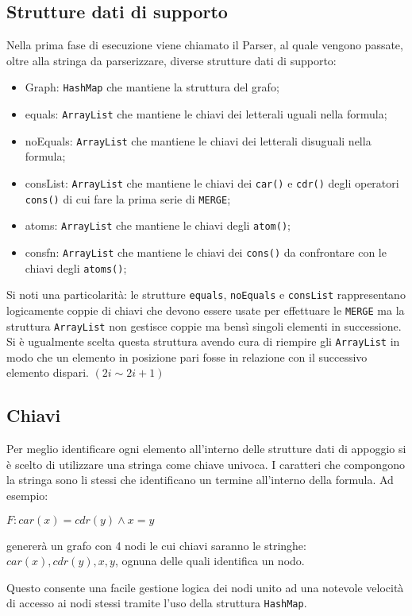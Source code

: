 \documentclass[a4paper,11pt]{article}
\begin{document}
\subsection{Strutture dati di supporto}
Nella prima fase di esecuzione viene chiamato il Parser, al quale vengono passate, oltre alla stringa da parserizzare, diverse strutture dati di supporto:
\begin{itemize}
	\item Graph: {\tt HashMap} che mantiene la struttura del grafo;
	\item equals: {\tt ArrayList} che mantiene le chiavi dei letterali uguali nella formula;
	\item noEquals: {\tt ArrayList} che mantiene le chiavi dei letterali disuguali nella formula;
	\item consList: {\tt ArrayList} che mantiene le chiavi dei {\tt car()} e {\tt cdr()} degli operatori {\tt cons()} di cui fare la prima serie di {\tt MERGE};
	\item atoms: {\tt ArrayList} che mantiene le chiavi degli {\tt atom()};
	\item consfn: {\tt ArrayList} che mantiene le chiavi dei {\tt cons()} da confrontare con le chiavi degli {\tt atoms()}; 
\end{itemize}
Si noti una particolarità: le strutture {\tt equals}, {\tt noEquals} e {\tt consList} rappresentano logicamente coppie di chiavi che devono essere usate per effettuare le {\tt MERGE} ma la struttura {\tt ArrayList} non gestisce coppie ma bensì singoli elementi in successione.
Si è ugualmente scelta questa struttura avendo cura di riempire gli {\tt ArrayList} in modo che un elemento in posizione pari fosse in relazione con il successivo elemento dispari. $(2i \sim 2i+1)$
\subsection{Chiavi}
Per meglio identificare ogni elemento all'interno delle strutture dati di appoggio si è scelto di utilizzare una stringa come chiave univoca.
I caratteri che compongono la stringa sono li stessi che identificano un termine all'interno della formula. Ad esempio:
\begin{center}
$F : car(x) = cdr(y) \wedge x = y $
\end{center}
genererà un grafo con 4 nodi le cui chiavi saranno le stringhe: $car(x),cdr(y),x,y$, ognuna delle quali identifica un nodo.

Questo consente una facile gestione logica dei nodi unito ad una notevole velocità di accesso ai nodi stessi tramite l'uso della struttura {\tt HashMap}.
\end{document}
